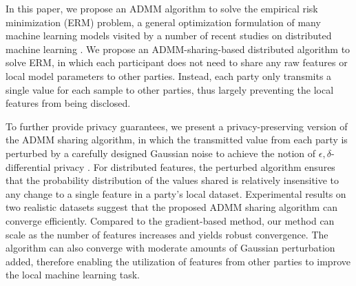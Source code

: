 In this paper, we propose an ADMM algorithm to solve the empirical risk minimization (ERM) problem, a general optimization formulation of many machine learning models visited by a number of recent studies on distributed machine learning  \cite{ying2018supervised,chaudhuri2011differentially}. We propose an ADMM-sharing-based distributed algorithm to solve ERM, in which each participant does not need to share any raw features or local model parameters to other parties. Instead, each party only transmits a single value for each sample to other parties, thus largely preventing the local features from being disclosed. 

To further provide privacy guarantees, we present a privacy-preserving version of the ADMM sharing algorithm, in which the transmitted value from each party is perturbed by a carefully designed Gaussian noise to achieve
the notion of $\epsilon,\delta$-differential privacy \cite{dwork2008differential,dwork2014algorithmic}. For distributed features, the perturbed algorithm ensures that the probability distribution of the values shared is relatively insensitive to any change to a single feature in a party's local dataset.
Experimental results on two realistic datasets suggest that the proposed ADMM sharing algorithm can converge efficiently. Compared to the gradient-based method, our method can scale as the number of features increases and yields robust convergence. The algorithm can also converge with moderate amounts of Gaussian perturbation added, therefore enabling the utilization of features from other parties to improve the local machine learning task.

